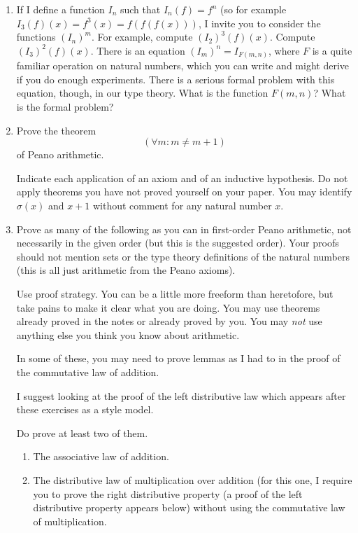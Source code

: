 \documentclass[12pt]{book}
\begin{document}
\begin{enumerate}

\item
If I define a function $I_n$ such that $I_n(f) = f^n$ (so for example
$I_3(f)(x) = f^3(x) = f(f(f(x)))$, I invite you to consider the
functions $(I_n)^m$.  For example, compute $(I_2)^3(f)(x)$.  Compute
$(I_3)^2(f)(x)$.  There is an equation $(I_m)^n = I_{F(m,n)}$, where
$F$ is a quite familiar operation on natural numbers, which you can
write and might derive if you do enough experiments.  There is a
serious formal problem with this equation, though, in our type theory.
What is the function $F(m,n)$?  What is the formal problem?

\item Prove  the theorem $$(\forall m:m \neq m+1)$$ of Peano arithmetic.

Indicate each application of an axiom and of an inductive hypothesis.
Do not apply theorems you have not proved yourself on your paper.  You
may identify $\sigma(x)$ and $x+1$ without comment for any natural
number $x$.

\item
 Prove as many of the following as you can in first-order Peano
 arithmetic, not necessarily in the given order (but this is the suggested order).  Your proofs should
 not mention sets or the type theory definitions of the natural
 numbers (this is all just arithmetic from the Peano axioms).

 Use proof strategy.  You can be a little more freeform than
 heretofore, but take pains to make it clear what you are doing.  You
 may use theorems already proved in the notes or already proved by
 you.  You may {\em not\/} use anything else you think you know about
 arithmetic.

In some of these, you may need to prove lemmas as I had to in the proof of the commutative law of addition.

I suggest looking at the proof of the left distributive law which appears after these exercises as a style model.

Do prove at least two of them.

\begin{enumerate}



\item The associative law of addition.

\item The distributive law of multiplication over addition (for this one, I require you to prove the right distributive property (a proof of the left distributive property appears below) without using the commutative law of multiplication.


\end{enumerate}
\end{enumerate}
\end{document}
